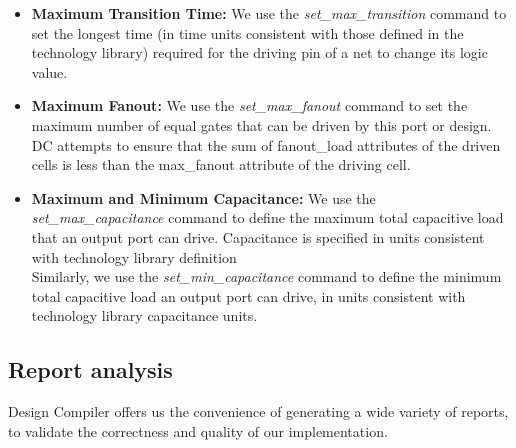 \documentclass[../main.tex]{subfiles}
\begin{document}
\begin{itemize}
\item \textbf{Maximum Transition Time:} We use the \textit{set\_max\_transition} command to set the longest time (in time units consistent with those defined in the technology library) required for the driving pin of a net to change its logic value.
\item \textbf{Maximum Fanout:} We use the \textit{set\_max\_fanout} command to set the maximum number of equal gates that can be driven by this port or design. DC attempts to ensure that the sum of fanout\_load attributes of the driven cells is less than the max\_fanout attribute of the driving cell.
\item \textbf{Maximum and Minimum Capacitance:} We use the \textit{set\_max\_capacitance} command to define the maximum total capacitive load that an output port can drive. Capacitance is specified in units consistent with technology library definition
\\Similarly, we use the\textit{ set\_min\_capacitance} command to define the minimum total capacitive load an output port can drive, in units consistent with technology library capacitance units.
\end{itemize}
\subsection{ Report analysis}
Design Compiler offers us the convenience of generating a wide variety of reports, to validate the correctness and quality of our implementation.
\end{document}
